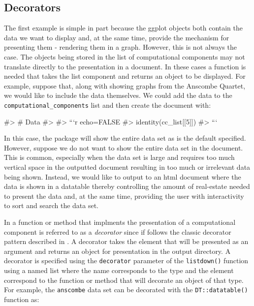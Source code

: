 \hypertarget{decorators}{%
\subsection{Decorators}\label{decorators}}

The first example is simple in part because the ggplot objects both
contain the data we want to display and, at the same time, provide the
mechanism for presenting them - rendering them in a graph. However, this
is not always the case. The objects being stored in the list of
computational components may not translate directly to the presentation
in a document. In these cases a function is needed that takes the list
component and returns an object to be displayed. For example, suppose
that, along with showing graphs from the Anscombe Quartet, we would like
to include the data themselves. We could add the data to the
\texttt{computational\_components} list and then create the document
with:

\begin{Schunk}
\begin{Soutput}
#> # Data
#> 
#> ```{r echo=FALSE}
#> identity(cc_list[[5]])
#> ```
\end{Soutput}
\end{Schunk}

In this case, the  package will show the entire data set
as is the default specified. However, suppose we do not want to show the
entire data set in the document. This is common, especially when the
data set is large and requires too much vertical space in the outputted
document resulting in too much or irrelevant data being shown. Instead,
we would like to output to an html document where the data is shown in a
datatable thereby controlling the amount of real-estate needed to
present the data and, at the same time, providing the user with
interactivity to sort and search the data set.

In  a function or method that implments the presentation
of a computational component is referred to as a \emph{decorator} since
if follows the classic decorator pattern described in \citet{gamma1995}.
A decorator takes the element that will be presented as an argument and
returns an object for presentation in the output directory. A decorator
is specified using the \texttt{decorator} parameter of the
\texttt{listdown()} function using a named list where the name
corresponds to the type and the element correspond to the function or
method that will decorate an object of that type. For example, the
\texttt{anscombe} data set can be decorated with the
\texttt{DT::datatable()} function \citep{xie2020} as:

